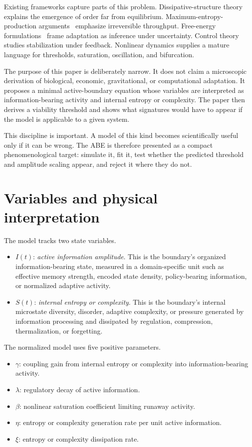 \documentclass[11pt]{article}
\begin{document}
Existing frameworks capture parts of this problem. Dissipative-structure theory~\cite{prigogine1967thermo,nicolis1977self} explains the emergence of order far from equilibrium. Maximum-entropy-production arguments~\cite{dewar2003info,martyushev2006mep} emphasize irreversible throughput. Free-energy formulations~\cite{friston2010free,buckley2017free} frame adaptation as inference under uncertainty. Control theory studies stabilization under feedback. Nonlinear dynamics supplies a mature language for thresholds, saturation, oscillation, and bifurcation.

The purpose of this paper is deliberately narrow. It does not claim a microscopic derivation of biological, economic, gravitational, or computational adaptation. It proposes a minimal active-boundary equation whose variables are interpreted as information-bearing activity and internal entropy or complexity. The paper then derives a viability threshold and shows what signatures would have to appear if the model is applicable to a given system.

This discipline is important. A model of this kind becomes scientifically useful only if it can be wrong. The ABE is therefore presented as a compact phenomenological target: simulate it, fit it, test whether the predicted threshold and amplitude scaling appear, and reject it where they do not.

\section{Variables and physical interpretation}
The model tracks two state variables.
\begin{itemize}
  \item $I(t)$: \textit{active information amplitude}. This is the boundary's organized information-bearing state, measured in a domain-specific unit such as effective memory strength, encoded state density, policy-bearing information, or normalized adaptive activity.
  \item $S(t)$: \textit{internal entropy or complexity}. This is the boundary's internal microstate diversity, disorder, adaptive complexity, or pressure generated by information processing and dissipated by regulation, compression, thermalization, or forgetting.
\end{itemize}

The normalized model uses five positive parameters.
\begin{itemize}
  \item $\gamma$: coupling gain from internal entropy or complexity into information-bearing activity.
  \item $\lambda$: regulatory decay of active information.
  \item $\beta$: nonlinear saturation coefficient limiting runaway activity.
  \item $\eta$: entropy or complexity generation rate per unit active information.
  \item $\xi$: entropy or complexity dissipation rate.
\end{itemize}
\end{document}
